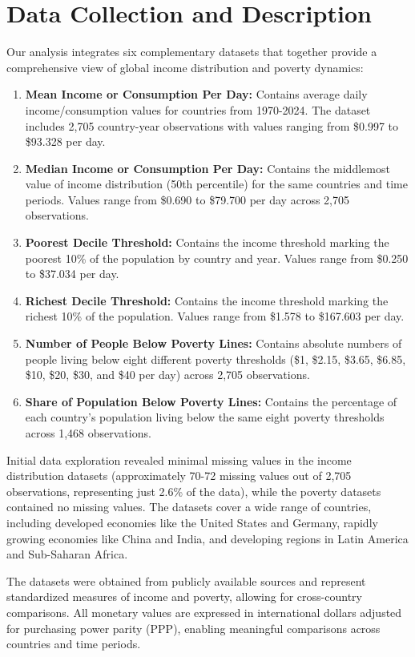 \documentclass[12pt,a4paper]{article}
\begin{document}
\section{Data Collection and Description}\label{sec:data}
Our analysis integrates six complementary datasets that together provide a comprehensive view of global income distribution and poverty dynamics:
\begin{enumerate}
    \item \textbf{Mean Income or Consumption Per Day:} Contains average daily income/consumption values for countries from 1970-2024. The dataset includes 2,705 country-year observations with values ranging from \$0.997 to \$93.328 per day.
    \item \textbf{Median Income or Consumption Per Day:} Contains the middlemost value of income distribution (50th percentile) for the same countries and time periods. Values range from \$0.690 to \$79.700 per day across 2,705 observations.
    \item \textbf{Poorest Decile Threshold:} Contains the income threshold marking the poorest 10\% of the population by country and year. Values range from \$0.250 to \$37.034 per day.
    \item \textbf{Richest Decile Threshold:} Contains the income threshold marking the richest 10\% of the population. Values range from \$1.578 to \$167.603 per day.
    \item \textbf{Number of People Below Poverty Lines:} Contains absolute numbers of people living below eight different poverty thresholds (\$1, \$2.15, \$3.65, \$6.85, \$10, \$20, \$30, and \$40 per day) across 2,705 observations.
    \item \textbf{Share of Population Below Poverty Lines:} Contains the percentage of each country's population living below the same eight poverty thresholds across 1,468 observations.
\end{enumerate}

Initial data exploration revealed minimal missing values in the income distribution datasets (approximately 70-72 missing values out of 2,705 observations, representing just 2.6\% of the data), while the poverty datasets contained no missing values. The datasets cover a wide range of countries, including developed economies like the United States and Germany, rapidly growing economies like China and India, and developing regions in Latin America and Sub-Saharan Africa.

The datasets were obtained from publicly available sources \cite{hasell2022poverty} and represent standardized measures of income and poverty, allowing for cross-country comparisons. All monetary values are expressed in international dollars adjusted for purchasing power parity (PPP), enabling meaningful comparisons across countries and time periods.
\end{document}
